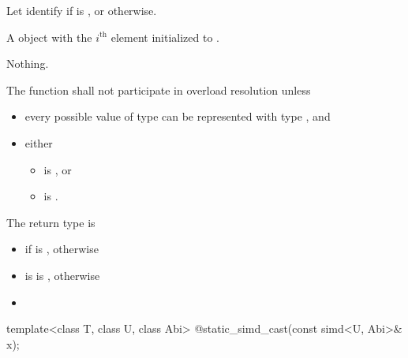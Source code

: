 \begin{itemdescr}
  \pnum
  Let  identify  if  is , or  otherwise.

  \pnum\returns
  A  object with the $i^\text{th}$ element initialized to  \foralli.

  \pnum\throws Nothing.

  \pnum\remarks
  The function shall not participate in overload resolution unless

  \begin{itemize}
    \item every possible value of type  can be represented with type , and
    \item either
      \begin{itemize}
        \item {} is , or
        \item {} is .
      \end{itemize}
  \end{itemize}

  \pnum
  The return type is
  \begin{itemize}
    \item {} if  is , otherwise
    \item {} is  is , otherwise
    \item {}
  \end{itemize}
\end{itemdescr}

\begin{itemdecl}
template<class T, class U, class Abi> @\seebelow@ static_simd_cast(const simd<U, Abi>& x);
\end{itemdecl}

